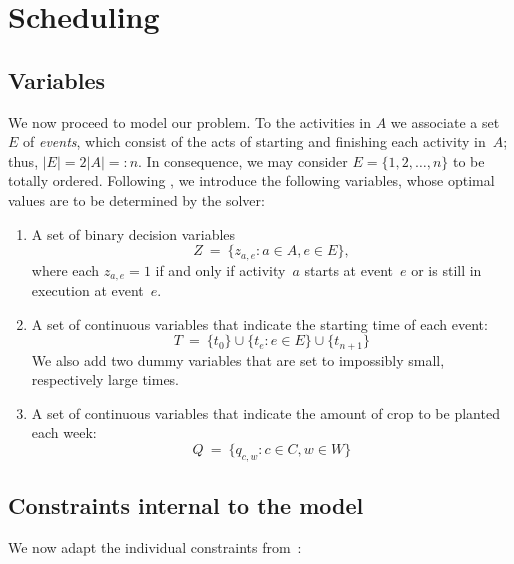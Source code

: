 \documentclass[11pt,reqno]{amsart}
\numberwithin{equation}{section}
\begin{document}
\section{Scheduling}

\subsection{Variables}

We now proceed to model our problem.  To the activities in $A$ we associate a set~$E$ of
\emph{events}, which consist of the acts of starting and finishing each activity in~$A$;
thus, $|E|=2|A|=:n$. In consequence, we may consider $E=\{1,2,\dots, n\}$ to be
totally ordered.  Following \cite{artigues-etal11}, we introduce the following variables,
whose optimal values are to be determined by the solver:

\begin{enumerate}
\item A set of binary decision variables 
  \[
     Z
     \ = \
     \big\{z_{a,e}: a\in A, e\in E\big\},
  \]
  where each $z_{a,e}=1$ if and only if activity~$a$ starts at
  event~$e$ or is still in execution at event~$e$.

\smallskip
\item A set of continuous variables that indicate the starting time of each event:
  \[
     T
     \ = \
     \{t_0\}\cup\big\{t_e : e\in E\big\}\cup\{t_{n+1}\}
  \]
  We also add two dummy variables that are set to impossibly small, respectively large times.

\smallskip
\item A set of continuous variables that indicate the amount of crop to be planted each week:
  \[
     Q
     \ = \
     \big\{q_{c,w} : c\in C, w\in W\big\}
  \]


\end{enumerate}

\subsection{Constraints internal to the model}

We now adapt the individual constraints from~\cite{artigues-etal11}:
\end{document}
